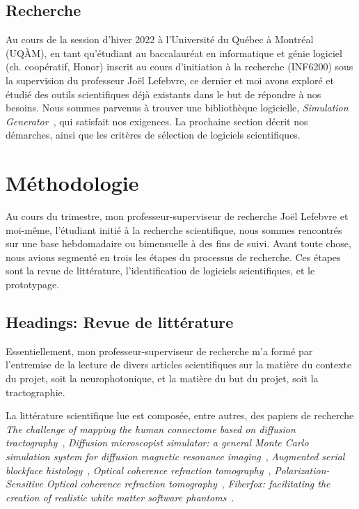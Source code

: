 \documentclass{article}
\begin{document}
  \subsection{Recherche}
  \label{subsec:research}
  Au cours de la session d'hiver 2022 à l'Université du Québec à Montréal (UQÀM), en tant qu'étudiant au baccalauréat en informatique et génie logiciel (ch.
  coopératif, Honor) inscrit au cours d'initiation à la recherche (INF6200) sous la supervision du professeur Joël Lefebvre, ce dernier et moi avons exploré et étudié
  des outils scientifiques déjà existants dans le but de répondre à nos besoins.
  Nous sommes parvenus à trouver une bibliothèque logicielle, \textit{Simulation Generator}~\citep{valcourtcaron2022simulationgenerator}, qui satisfait nos exigences.
  La prochaine section décrit nos démarches, ainsi que les critères de sélection de logiciels scientifiques.


  \section{Méthodologie}
  \label{sec:methodology}
  Au cours du trimestre, mon professeur-superviseur de recherche Joël Lefebvre et moi-même, l'étudiant initié à la recherche scientifique, nous sommes rencontrés sur
  une base hebdomadaire ou bimensuelle à des fins de suivi.
  Avant toute chose, nous avions segmenté en trois les étapes du processus de recherche.
  Ces étapes sont la revue de littérature, l'identification de logiciels scientifiques, et le prototypage.

  \subsection{Headings: Revue de littérature}
  \label{subsec:headings:literature-review}

  Essentiellement, mon professeur-superviseur de recherche m'a formé par l'entremise de la lecture de divers articles scientifiques sur la matière du contexte du
  projet, soit la neurophotonique, et la matière du but du projet, soit la tractographie.

  La littérature scientifique lue est composée, entre autres, des papiers de recherche
  \textit{The challenge of mapping the human connectome based on diffusion tractography}~\citep{maierhein2017mappingconnectomedifftracto},
  \textit{Diffusion microscopist simulator: a general Monte Carlo simulation system for diffusion magnetic resonance imaging}~\citep{yeh2013diffmicrosim},
  \textit{Augmented serial blockface histology}~\citep{lefebvre2019augserialblockfacehist},
  \textit{Optical coherence refraction tomography}~\citep{zhou2019ocrt},
  \textit{Polarization-Sensitive Optical coherence refraction tomography}~\citep{lefebvre2021psocrt},
  \textit{Fiberfox: facilitating the creation of realistic white matter software phantoms}~\citep{neher2014fiberfox}.
\end{document}
